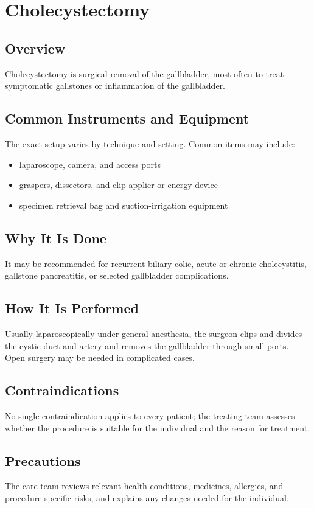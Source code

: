 \chapter{Cholecystectomy}

\section*{Overview}
Cholecystectomy is surgical removal of the gallbladder, most often to treat symptomatic gallstones or inflammation of the gallbladder.

\section*{Common Instruments and Equipment}
The exact setup varies by technique and setting. Common items may include:
\begin{itemize}[nosep,leftmargin=*]
  \item laparoscope, camera, and access ports
  \item graspers, dissectors, and clip applier or energy device
  \item specimen retrieval bag and suction-irrigation equipment
\end{itemize}

\section*{Why It Is Done}
It may be recommended for recurrent biliary colic, acute or chronic cholecystitis, gallstone pancreatitis, or selected gallbladder complications.

\section*{How It Is Performed}
Usually laparoscopically under general anesthesia, the surgeon clips and divides the cystic duct and artery and removes the gallbladder through small ports. Open surgery may be needed in complicated cases.

\section*{Contraindications}
No single contraindication applies to every patient; the treating team assesses whether the procedure is suitable for the individual and the reason for treatment.

\section*{Precautions}
The care team reviews relevant health conditions, medicines, allergies, and procedure-specific risks, and explains any changes needed for the individual.

